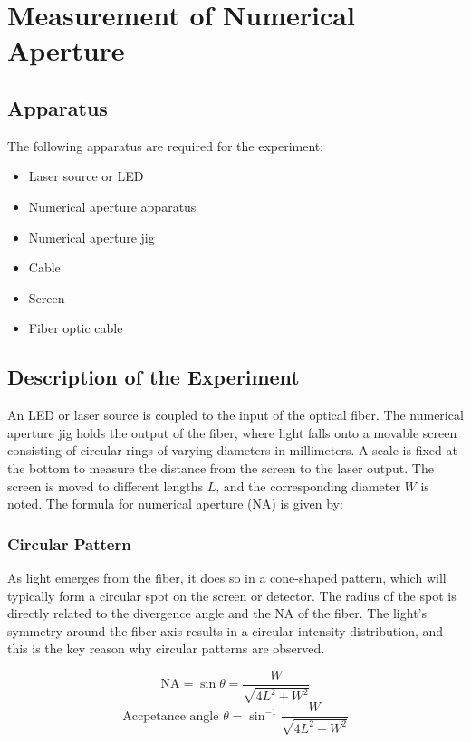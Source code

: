 \documentclass{article}
\theoremstyle{mytheoremstyle}
\theoremstyle{mytheoremstyle}
\theoremstyle{myproblemstyle}
\begin{document}
\section{Measurement of Numerical Aperture}


\subsection{Apparatus}

The following apparatus are required for the experiment:
\begin{itemize}
    \item Laser source or LED
    \item Numerical aperture apparatus
    \item Numerical aperture jig
    \item Cable
    \item Screen
    \item Fiber optic cable
\end{itemize}

\subsection{Description of the Experiment}

An LED or laser source is coupled to the input of the optical fiber. The numerical aperture jig holds the output of the fiber, where light falls onto a movable screen consisting of circular rings of varying diameters in millimeters. A scale is fixed at the bottom to measure the distance from the screen to the laser output. The screen is moved to different lengths \(L\), and the corresponding diameter \(W\) is noted. The formula for numerical aperture (NA) is given by:

\subsubsection{Circular Pattern}

As light emerges from the fiber, it does so in a cone-shaped pattern, which will typically form a circular spot on the screen or detector. The radius of the spot is directly related to the divergence angle and the NA of the fiber. The light's symmetry around the fiber axis results in a circular intensity distribution, and this is the key reason why circular patterns are observed.

\[
\text{NA} = \sin \theta = \frac{W}{\sqrt{4L^2 + W^2}}
\]
\[
  \text{Accpetance angle } \theta = \sin^{-1}\frac{W}{\sqrt{4L^2 + W^2}}
\]
\end{document}
